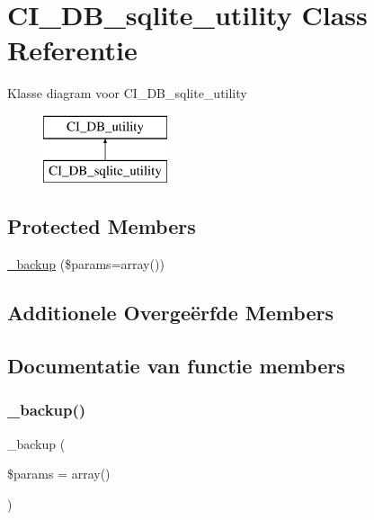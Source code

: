 \hypertarget{class_c_i___d_b__sqlite__utility}{}\section{C\+I\+\_\+\+D\+B\+\_\+sqlite\+\_\+utility Class Referentie}
\label{class_c_i___d_b__sqlite__utility}
Klasse diagram voor C\+I\+\_\+\+D\+B\+\_\+sqlite\+\_\+utility\begin{figure}[H]
\begin{center}
\leavevmode
\includegraphics[height=2.000000cm]{class_c_i___d_b__sqlite__utility}
\end{center}
\end{figure}
\subsection*{Protected Members}
\begin{DoxyCompactItemize}
\item 
\mbox{\hyperlink{class_c_i___d_b__sqlite__utility_a30f3053d2c82e7562349924363507afa}{\+\_\+backup}} (\$params=array())
\end{DoxyCompactItemize}
\subsection*{Additionele Overge\"{e}rfde Members}


\subsection{Documentatie van functie members}
\mbox{\label{class_c_i___d_b__sqlite__utility_a30f3053d2c82e7562349924363507afa}} 
\subsubsection{\texorpdfstring{\_backup()}{\_backup()}}
{\footnotesize\ttfamily \+\_\+backup (\begin{DoxyParamCaption}\item[{}]{\$params = {\ttfamily array()} }\end{DoxyParamCaption})\hspace{0.3cm}{\ttfamily [protected]}}


